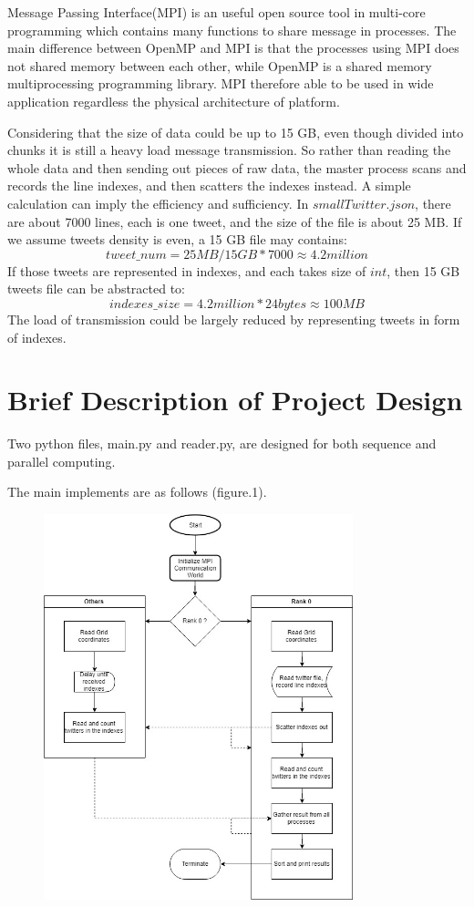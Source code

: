 \documentclass[11pt]{article}
\begin{document}
Message Passing  Interface(MPI) is an useful open source tool in multi-core programming which contains many functions to share message in processes. The main difference between OpenMP and MPI is that the processes using MPI does not shared memory between each other, while OpenMP is a shared memory multiprocessing programming library.  MPI therefore able to be used in wide application regardless the physical architecture of platform.

Considering that the size of data could be up to 15 GB, even though divided into chunks it is still a heavy load message transmission. So rather than reading the whole data and then sending out pieces of raw data, the master process scans and records the line indexes, and then scatters the indexes instead. A simple calculation can imply the efficiency and sufficiency. In $smallTwitter.json$, there are
about 7000 lines, each is one tweet, and the size of the file is about 25 MB. If we assume tweets density is even, a 15 GB file may contains: \[tweet\_num = 25MB / 15GB * 7000 \approx 4.2million\] If those tweets are represented in indexes, and each takes size of $int$, then 15 GB tweets file can be abstracted to: \[indexes\_size = 4.2million * 24bytes \approx 100MB \] The load of transmission could be largely reduced by representing tweets in form of indexes.


\section{Brief Description of Project Design}
Two python files, main.py and reader.py, are designed for both sequence and parallel computing.

The main implements are as follows (figure.1).
\begin{figure}[h]
\includegraphics[width=0.8\textwidth]{process}
\end{figure}
\end{document}
